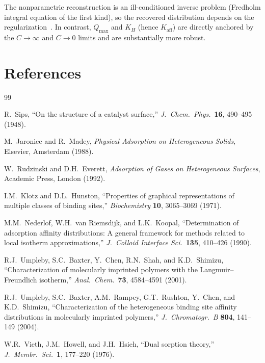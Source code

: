 \documentclass[12pt]{article}
\begin{document}
The nonparametric reconstruction is an ill-conditioned inverse problem
(Fredholm integral equation of the first kind), so the recovered
distribution depends on the regularization~\cite{Hansen1998}.  In
contrast, $Q_{\max}$ and $K_H$ (hence $K_{\mathrm{aff}}$) are
directly anchored by the $C\to\infty$ and $C\to 0$ limits and are
substantially more robust.

\section*{References}

\begin{thebibliography}{99}

R.~Sips, ``On the structure of a catalyst surface,''
\textit{J.\ Chem.\ Phys.}\ \textbf{16}, 490--495 (1948).

M.~Jaroniec and R.~Madey,
\textit{Physical Adsorption on Heterogeneous Solids},
Elsevier, Amsterdam (1988).

W.~Rudzinski and D.H.~Everett,
\textit{Adsorption of Gases on Heterogeneous Surfaces},
Academic Press, London (1992).

I.M.~Klotz and D.L.~Hunston,
``Properties of graphical representations of multiple classes of
binding sites,''
\textit{Biochemistry} \textbf{10}, 3065--3069 (1971).

M.M.~Nederlof, W.H.~van Riemsdijk, and L.K.~Koopal,
``Determination of adsorption affinity distributions: A general framework
for methods related to local isotherm approximations,''
\textit{J.\ Colloid Interface Sci.}\ \textbf{135}, 410--426 (1990).

R.J.~Umpleby, S.C.~Baxter, Y.~Chen, R.N.~Shah, and K.D.~Shimizu,
``Characterization of molecularly imprinted polymers with the
Langmuir--Freundlich isotherm,''
\textit{Anal.\ Chem.}\ \textbf{73}, 4584--4591 (2001).

R.J.~Umpleby, S.C.~Baxter, A.M.~Rampey, G.T.~Rushton, Y.~Chen, and
K.D.~Shimizu,
``Characterization of the heterogeneous binding site affinity
distributions in molecularly imprinted polymers,''
\textit{J.\ Chromatogr.\ B} \textbf{804}, 141--149 (2004).

W.R.~Vieth, J.M.~Howell, and J.H.~Hsieh,
``Dual sorption theory,''
\textit{J.\ Membr.\ Sci.}\ \textbf{1}, 177--220 (1976).


\end{thebibliography}
\end{document}
